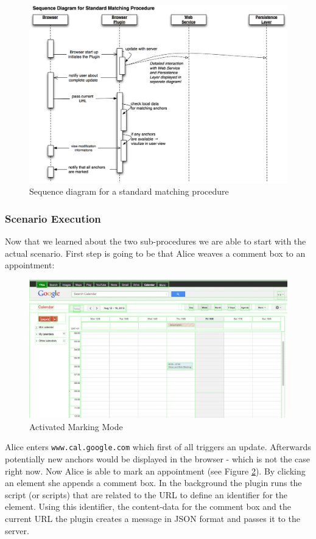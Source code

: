 \begin{figure}\centering
		\includegraphics[width=13cm]{images/sequence-matching-process.png}
		\caption{Sequence diagram for a standard matching procedure}
		\label{sequence-matching-process}
\end{figure} 

\subsubsection{Scenario Execution}
Now that we learned about the two sub-procedures we are able to start with the actual scenario. First step is going to be that Alice weaves a comment box to an appointment: 

\begin{figure}\centering
	\includegraphics[width=13cm]{images/gcal-marking-mode.png}
\caption{Activated Marking Mode}
\label{gcal-marking-mode}
\end{figure}

Alice enters \verb+www.cal.google.com+ which first of all triggers an update. Afterwards potentially new anchors would be displayed in the browser - which is not the case right now. 
Now Alice is able to mark an appointment (see Figure \ref{gcal-marking-mode}). By clicking an element she appends a comment box. 
In the background the plugin runs the script (or scripts) that are related to the URL to define an identifier for the element. 
Using this identifier, the content-data for the comment box and the current URL the plugin creates a message in JSON format and passes it to the server. 


